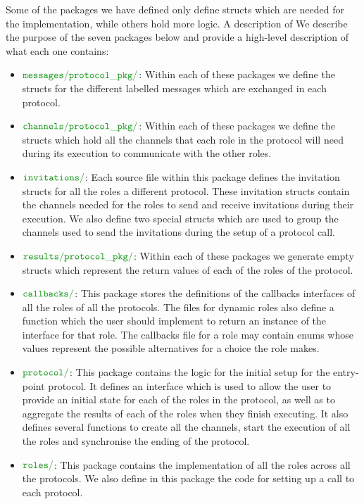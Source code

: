 \documentclass[12pt,twoside]{report}
\begin{document}
Some of the packages we have defined only define structs which are needed for the implementation, while others hold more logic. A description of  We describe the purpose of the seven packages below and provide a high-level description of what each one contains:


\begin{itemize}
    \item $\dirname{messages}\dirname{protocol\_pkg}$: Within each of these packages we define the structs for the different labelled messages which are exchanged in each protocol.
    \item  $\dirname{channels}\dirname{protocol\_pkg}$: Within each of these packages we define the structs which hold all the channels that each role in the protocol will need during its execution to communicate with the other roles.
    \item $\dirname{invitations}$: Each source file within this package defines the invitation structs for all the roles a different protocol. These invitation structs contain the channels needed for the roles to send and receive invitations during their execution. We also define two special structs which are used to group the channels used to send the invitations during the setup of a protocol call. 
    \item $\dirname{results}\dirname{protocol\_pkg}$: Within each of these packages we generate empty structs which represent the return values of each of the roles of the protocol.
    \item $\dirname{callbacks}$: This package stores the definitions of the callbacks interfaces of all the roles of all the protocols. The files for dynamic roles also define a function which the user should implement to return an instance of the interface for that role. The callbacks file for a role may contain enums whose values represent the possible alternatives for a choice the role makes.
    \item $\dirname{protocol}$: This package contains the logic for the initial setup for the entry-point protocol. It defines an interface which is used to allow the user to provide an initial state for each of the roles in the protocol, as well as to aggregate the results of each of the roles when they finish executing. It also defines several functions to create all the channels, start the execution of all the roles and synchronise the ending of the protocol.
    \item $\dirname{roles}$: This package contains the implementation of all the roles across all the protocols. We also define in this package the code for setting up a call to each protocol.
\end{itemize}
\end{document}
